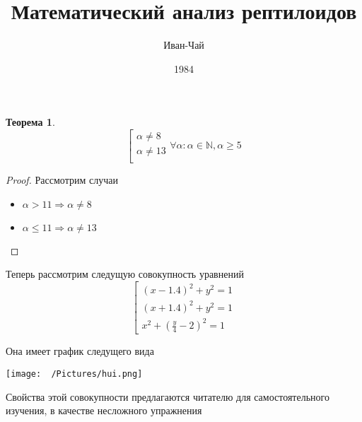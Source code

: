 \documentclass[a6paper, 10pt]{book}
\theoremstyle{plain}
\newtheorem*{theorem_}{Теорема}
\newcommand{\N}{\mathbb N}
\newcommand{\rarrow}{\Rightarrow}
\begin{document}
	\author{Иван-Чай}
	\date{1984}
	\title{Математический анализ рептилоидов}

	\linespread{1.4}
	\selectfont

	\maketitle
	\newpage


	\begin{theorem_}
		\[ %
		\left[
		\begin{gathered}
			\alpha \neq 8
			\\
			\alpha \neq 13
			\\
		\end{gathered}
		\forall \alpha : \alpha \in \N, \alpha \geq 5
		\] %
	\end{theorem_}

	\begin{proof}
		Рассмотрим случаи

		\begin{itemize}
			\item $ \alpha > 11 \rarrow \alpha \neq 8 $
			\item $ \alpha \leq 11 \rarrow \alpha \neq 13 $
		\end{itemize}
	\end{proof}

	Теперь рассмотрим следущую совокупность уравнений
	\[ %
		\left[
		\begin{gathered}
			(x - 1.4)^2 + y^2 = 1
			\\
			(x + 1.4)^2 + y^2 = 1
			\\
			x^2 + \left(\frac{y}{4} - 2\right)^2 = 1
		\end{gathered}
	\] %

	Она имеет график следущего вида

	\texttt{[image: ~/Pictures/hui.png]}

	Свойства этой совокупности предлагаются читателю для самостоятельного изучения, в качестве несложного упражнения
\end{document}
